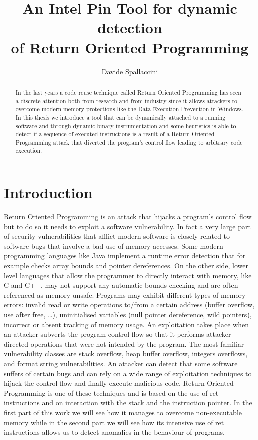 \documentclass[Lau,binding=0.6cm]{sapthesis}
\title{An Intel Pin Tool for dynamic detection\\ of Return Oriented Programming}
\author{Davide Spallaccini}
\begin{document}
\frontmatter

\maketitle

\dedication{Dedicated to\\ Jon Skeet}

\begin{abstract}
In the last years a code reuse technique called Return Oriented Programming has seen a discrete attention both from research and from industry since it allows attackers to overcome modern memory protections like the Data Execution Prevention in Windows.
In this thesis we introduce a tool that can be dynamically attached to a running software and through dynamic binary instrumentation and some heuristics is able to detect if a sequence of executed instructions is a result of a Return Oriented Programming attack that diverted the program’s control flow leading to arbitrary code execution.
\end{abstract}


\tableofcontents

\chapter{Introduction}
Return Oriented Programming is an attack that hijacks a program's control flow but to do so it needs to exploit a software vulnerability. In fact a very large part of security vulnerabilities that afflict modern software is closely related to software bugs that involve a bad use of memory accesses. Some modern programming languages like Java implement a runtime error detection that for example checks array bounds and pointer dereferences. On the other side, lower level languages that allow the programmer to directly interact with memory, like C and C++, may not support any automatic bounds checking and are often referenced as memory-unsafe.
Programs may exhibit different types of memory errors: invalid read or write operations to/from a certain address (buffer overflow, use after free, …), uninitialised variables (null pointer dereference, wild pointers), incorrect or absent tracking of memory usage. An exploitation takes place when an attacker subverts the program control flow so that it performs attacker-directed operations that were not intended by the program.
The most familiar vulnerability classes are stack overflow, heap buffer overflow, integers overflows, and format string vulnerabilities.
An attacker can detect that some software suffers of certain bugs and can rely on a wide range of exploitation techniques to hijack the control flow and finally execute malicious code. Return Oriented Programming is one of these techniques and is based on the use of ret instructions and on interaction with the stack and the instruction pointer. In the first part of this work we will see how it manages to overcome non-executable memory while in the second part we will see how its intensive use of ret instructions allows us to detect anomalies in the behaviour of programs.
\end{document}
